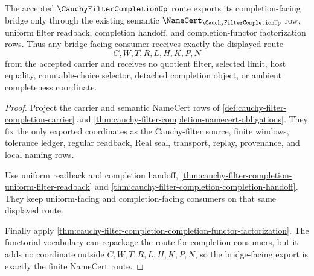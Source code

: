 \begin{theorem}
\label{thm:cauchy-filter-completion-bridged-route}
The accepted $\CauchyFilterCompletionUp$ route exports its completion-facing bridge only through the existing semantic $\NameCert_{\CauchyFilterCompletionUp}$ row, uniform filter readback, completion handoff, and completion-functor factorization rows. Thus any bridge-facing consumer receives exactly the displayed route
$$
C,W,T,R,L,H,K,P,N
$$
from the accepted carrier and receives no quotient filter, selected limit, host equality, countable-choice selector, detached completion object, or ambient completeness coordinate.
\end{theorem}
\begin{proof}
Project the carrier and semantic NameCert rows of \autoref{def:cauchy-filter-completion-carrier} and \autoref{thm:cauchy-filter-completion-namecert-obligations}. They fix the only exported coordinates as the Cauchy-filter source, finite windows, tolerance ledger, regular readback, Real seal, transport, replay, provenance, and local naming rows.

Use uniform readback and completion handoff, \autoref{thm:cauchy-filter-completion-uniform-filter-readback} and \autoref{thm:cauchy-filter-completion-completion-handoff}. They keep uniform-facing and completion-facing consumers on that same displayed route.

Finally apply \autoref{thm:cauchy-filter-completion-completion-functor-factorization}. The functorial vocabulary can repackage the route for completion consumers, but it adds no coordinate outside $C,W,T,R,L,H,K,P,N$, so the bridge-facing export is exactly the finite NameCert route.
\end{proof}

